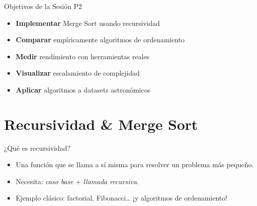 \documentclass[10pt]{beamer}
\begin{document}
\begin{frame}{Objetivos de la Sesión P2}
  \begin{itemize}
    \item \textbf{Implementar} Merge Sort usando recursividad
    \item \textbf{Comparar} empíricamente algoritmos de ordenamiento
    \item \textbf{Medir} rendimiento con herramientas reales
    \item \textbf{Visualizar} escalamiento de complejidad
    \item \textbf{Aplicar} algoritmos a datasets astronómicos
  \end{itemize}
\end{frame}



\section{Recursividad \& Merge Sort}
\begin{frame}[fragile]{¿Qué es recursividad?}
\begin{itemize}
  \item Una función que se llama a sí misma para resolver un problema más pequeño.
  \item Necesita: \textit{caso base} + \textit{llamada recursiva}.
  \item Ejemplo clásico: factorial, Fibonacci… ¡y algoritmos de ordenamiento!
\end{itemize}
\end{frame}

%
\end{document}
